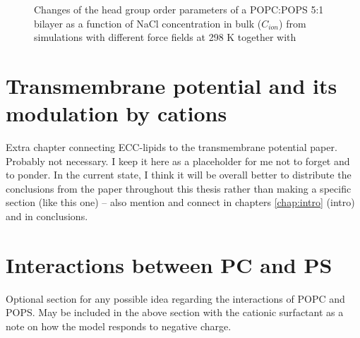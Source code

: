 \begin{figure}[htb!]
  \caption{\label{fig:delta_ordPar_NaCl} 
    Changes of the head group order parameters of a POPC:POPS 5:1 bilayer as a function of NaCl concentration 
    in bulk ($C_{ion}$) from simulations with different force fields at 298 K together with  
  } 
\end{figure} 






\section{Transmembrane potential and its modulation by cations}

Extra chapter connecting ECC-lipids to the transmembrane potential paper.
Probably not necessary.
I keep it here as a placeholder for me not to forget and to ponder.
In the current state, I think it will be overall better to distribute the conclusions from the paper throughout this thesis rather than making a specific section (like this one) -- also mention and connect in chapters \ref{chap:intro} (intro) and in conclusions. 


\section{Interactions between PC and PS}

Optional section for any possible idea regarding the interactions of POPC and POPS.
May be included in the above section with the cationic surfactant as a note on how the model responds to negative charge. 

